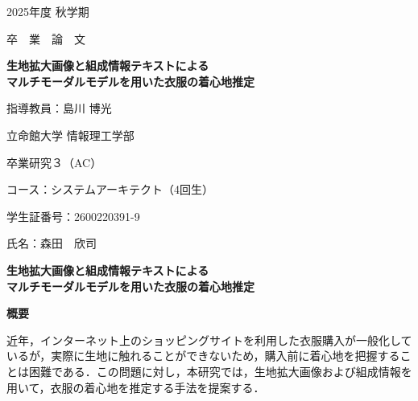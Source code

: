 \documentclass[a4paper,12pt]{jreport}
\begin{document}
\begin{titlepage}
  \centering

  \vspace*{22mm}
  {\Large 2025年度 秋学期\par}

  \vspace{1mm}
  {\Large 卒\ \ 業\ \ 論\ \ 文\par}

  \vspace{15mm}
  {\LARGE\bfseries
   生地拡大画像と組成情報テキストによる\\マルチモーダルモデルを用いた衣服の着心地推定
  \par}

  \vspace{22mm}
  {\Large 指導教員：島川 博光\par}

  {\Large 立命館大学 情報理工学部\par}
  \vspace{1mm}
  {\Large 卒業研究３（AC）\par}

  \vspace{22mm}
  {\large コース：システムアーキテクト（4回生）\par}
  \vspace{1mm}
  {\large 学生証番号：2600220391-9\par}
  \vspace{1mm}
  {\large 氏名：森田\ \ 欣司\par}

  \vspace*{10mm}
\end{titlepage}





\begin{center}
{\LARGE {\bf 生地拡大画像と組成情報テキストによる\\マルチモーダルモデルを用いた衣服の着心地推定}}


\vspace{10mm}

{\Large {\bf 概要}}
\end{center}

\setlength{\baselineskip}{8mm}

近年，インターネット上のショッピングサイトを利用した衣服購入が一般化しているが，実際に生地に触れることができないため，購入前に着心地を把握することは困難である．この問題に対し，本研究では，生地拡大画像および組成情報を用いて，衣服の着心地を推定する手法を提案する．
\end{document}
